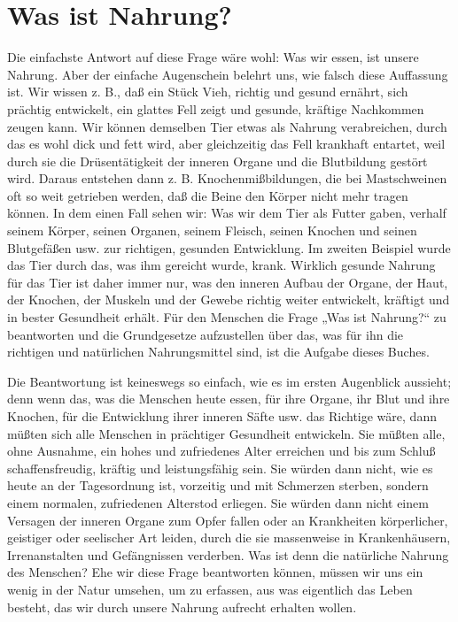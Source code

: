 \chapter{Was ist Nahrung?}
Die einfachste Antwort auf diese Frage wäre wohl: Was wir essen,
ist unsere Nahrung. Aber der einfache Augenschein belehrt uns, wie
falsch diese Auffassung ist. Wir wissen z. B., daß ein Stück Vieh,
richtig und gesund ernährt, sich prächtig entwickelt, ein glattes Fell
zeigt und gesunde, kräftige Nachkommen zeugen kann. Wir können
demselben Tier etwas als Nahrung verabreichen, durch das es wohl
dick und fett wird, aber gleichzeitig das Fell krankhaft entartet, weil
durch sie die Drüsentätigkeit der inneren Organe und die Blutbildung
gestört wird. Daraus entstehen dann z. B. Knochenmißbildungen, die
bei Mastschweinen oft so weit getrieben werden, daß die Beine den
Körper nicht mehr tragen können. In dem einen Fall sehen wir: Was
wir dem Tier als Futter gaben, verhalf seinem Körper, seinen Organen,
seinem Fleisch, seinen Knochen und seinen Blutgefäßen usw. zur richtigen, gesunden Entwicklung. Im zweiten Beispiel wurde das Tier
durch das, was ihm gereicht wurde, krank. Wirklich gesunde Nahrung
für das Tier ist daher immer nur, was den inneren Aufbau der Organe,
der Haut, der Knochen, der Muskeln und der Gewebe richtig weiter
entwickelt, kräftigt und in bester Gesundheit erhält. Für den Menschen
die Frage „Was ist Nahrung?“ zu beantworten und die Grundgesetze
aufzustellen über das, was für ihn die richtigen und natürlichen
Nahrungsmittel sind, ist die Aufgabe dieses Buches.

Die Beantwortung ist keineswegs so einfach, wie es im ersten Augenblick
aussieht; denn wenn das, was die Menschen heute essen, für ihre
Organe, ihr Blut und ihre Knochen, für die Entwicklung ihrer inneren
Säfte usw. das Richtige wäre, dann müßten sich alle Menschen in
prächtiger Gesundheit entwickeln. Sie müßten alle, ohne Ausnahme, ein
hohes und zufriedenes Alter erreichen und bis zum Schluß schaffensfreudig,
kräftig und leistungsfähig sein. Sie würden dann nicht, wie es
heute an der Tagesordnung ist, vorzeitig und mit Schmerzen sterben,
sondern einem normalen, zufriedenen Alterstod erliegen. Sie würden
dann nicht einem Versagen der inneren Organe zum Opfer fallen oder
an Krankheiten körperlicher, geistiger oder seelischer Art leiden, durch
die sie massenweise in Krankenhäusern, Irrenanstalten und Gefängnissen verderben.
Was ist denn die natürliche Nahrung des Menschen?
Ehe wir diese Frage beantworten können, müssen wir uns ein wenig
in der Natur umsehen, um zu erfassen, aus was eigentlich das Leben
besteht, das wir durch unsere Nahrung aufrecht erhalten wollen.